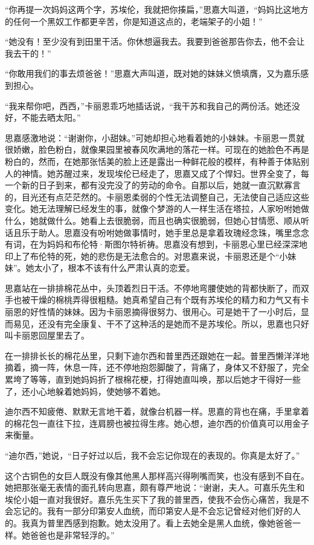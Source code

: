 \par “你再提一次妈妈这两个字，苏埃伦，我就把你揍扁，”思嘉大叫道，“妈妈比这地方的任何一个黑奴工作都更辛苦，你是知道这点的，老端架子的小姐！”
\par “她没有！至少没有到田里干活。你休想逼我去。我要到爸爸那告你去，他不会让我去干的！”
\par “你敢用我们的事去烦爸爸！”思嘉大声叫道，既对她的妹妹义愤填膺，又为嘉乐感到担心。
\par “我来帮你吧，西西，”卡丽恩乖巧地插话说，“我干苏和我自己的两份活。她还没好，不能去晒太阳。”
\par 思嘉感激地说：“谢谢你，小甜妹。”可她却担心地看着她的小妹妹。卡丽恩一贯就很娇嫩，脸色粉白，就像果园里被春风吹满地的落花一样。可现在的她脸色不再是粉白的，然而，在她那张恬美的脸上还是露出一种鲜花般的模样，有种善于体贴别人的神情。她苏醒过来，发现埃伦已经走了，思嘉又成了个悍妇。世界全变了，每一个新的日子到来，都有没完没了的劳动的命令。自那以后，她就一直沉默寡言的，目光还有点茫茫然的。卡丽恩柔弱的个性无法调整自己，无法使自己适应这些变化。她无法理解已经发生的事，就像个梦游的人一样生活在塔拉，人家吩咐她做什么，她就做什么。她看上去很脆弱，而且也确实很脆弱，但她心甘情愿、顺从听话且乐于助人。思嘉没有吩咐她做事情时，她手里总是拿着玫瑰经念珠，嘴里念念有词，在为妈妈和布伦特·斯图尔特祈祷。思嘉没有想到，卡丽恩心里已经深深地印上了布伦特的死，她的悲伤是无法愈合的。对思嘉来说，卡丽恩还是个“小妹妹”。她太小了，根本不该有什么严肃认真的恋爱。
\par 思嘉站在一排排棉花丛中，头顶着烈日干活。不停地弯腰使她的背都快断了，而双手也被干燥的棉桃弄得很粗糙。她真希望自己有个既有苏埃伦的精力和力气又有卡丽恩的好性情的妹妹。因为卡丽恩摘得很努力、很用心。可是她干了一小时后，显而易见，还没有完全康复、干不了这种活的是她而不是苏埃伦。所以，思嘉也只好叫卡丽恩回屋里去了。
\par 在一排排长长的棉花丛里，只剩下迪尔西和普里西还跟她在一起。普里西懒洋洋地摘着，摘一阵，休息一阵，还不停地抱怨脚酸了，背痛了，身体又不舒服了，完全累垮了等等，直到她妈妈折了根棉花梗，打得她直叫唤，那以后她才干得好一些了，还小心地躲着她妈妈，使她够不着她。
\par 迪尔西不知疲倦、默默无言地干着，就像台机器一样。思嘉的背也在痛，手里拿着的棉花包一直往下拉，连肩膀也被拉得生疼。她心想，迪尔西的价值真可以用金子来衡量。
\par “迪尔西，”她说，“日子好过以后，我不会忘记你现在的表现的。你真是太好了。”
\par 这个古铜色的女巨人既没有像其他黑人那样高兴得咧嘴而笑，也没有感到不自在。她把那张毫无表情的面孔转向思嘉，颇有尊严地说：“谢谢，夫人。可嘉乐先生和埃伦小姐一直对我很好。嘉乐先生买下了我的普里西，使我不会伤心痛苦，我是不会忘记的。我有一部分印第安人血统，而印第安人是不会忘记曾经对他们好的人的。我真为普里西感到抱歉。她太没用了。看上去她全是黑人血统，像她爸爸一样。她爸爸也是非常轻浮的。”
